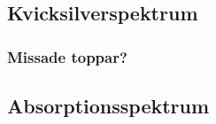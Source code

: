 \documentclass[11pt,a4paper]{article}
\begin{document}




\subsection{Kvicksilverspektrum}



\subsubsection{Missade toppar?}

\subsection{Absorptionsspektrum}
\end{document}
